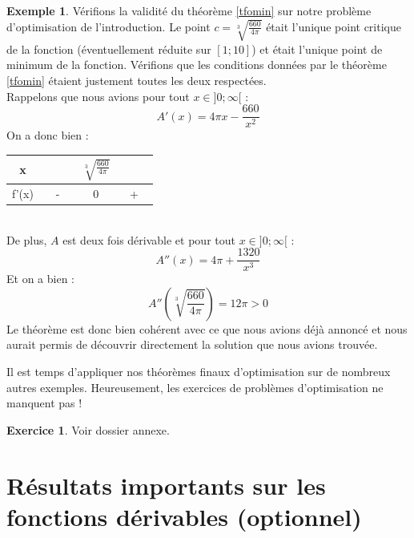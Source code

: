 \documentclass[a4paper,fontsize=13pt]{scrreprt}
\theoremstyle{plain}
\theoremstyle{definition}
\newtheorem{exe}[subsection]{Exemple}
\newtheorem*{exo*}{Exercice}
\begin{document}
\begin{exe}
Vérifions la validité du théorème \ref{tfomin} sur notre problème d'optimisation de l'introduction. Le point $c = \sqrt[3]{\frac{660}{4 \pi}}$ était l'unique point critique de la fonction (éventuellement réduite sur $[1;10]$) et était l'unique point de minimum de la fonction. Vérifions que les conditions données par le théorème \ref{tfomin} étaient justement toutes les deux respectées. \\
Rappelons que nous avions pour tout $x \in ]0;\infty[$ :
$$A'(x) = 4\pi x - \frac{660}{{x}^2}$$
On a donc bien :
\begin{center}
\begin{tabular}{|c|c c c|}
  \hline
  x & ~~~~ & $\sqrt[3]{\frac{660}{4 \pi}}$ & ~~~~ \\
  \hline
  f'(x) & - & 0 & + \\
  \hline
\end{tabular}
\end{center}
~~\\
De plus, $A$ est deux fois dérivable et pour tout $x \in ]0;\infty[$ :
$$A''(x) = 4\pi + \frac{1320}{{x}^3}$$
Et on a bien :
$$A''(\sqrt[3]{\frac{660}{4 \pi}}) = 12\pi >0$$
Le théorème est donc bien cohérent avec ce que nous avions déjà annoncé et nous aurait permis de découvrir directement la solution que nous avions trouvée.
\end{exe}
Il est temps d'appliquer nos théorèmes finaux d'optimisation sur de nombreux autres exemples. Heureusement, les exercices de problèmes d'optimisation ne manquent pas !
\begin{exo*}
Voir dossier annexe.
\end{exo*}

\chapter{Résultats importants sur les fonctions dérivables (optionnel)}
\end{document}

